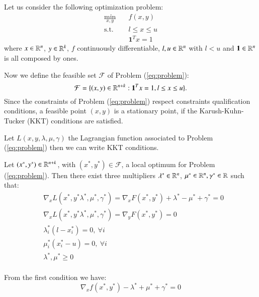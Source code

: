 Let us consider the following optimization problem:
\begin{subequations}\label{eq:problem} 
\begin{align}
\min_{x,y} & \quad f(x,y)  \\
\text{s.t.} & \quad l \leq x \leq u \\
& \quad \mathbf{1}^T x = 1 
\end{align}
\end{subequations}
where $x \in \mathbb{R}^n$, $y \in \mathbb{R}^k$, $f$ continuously differentiable, $l, u \in \mathbb{R}^n$ with $l < u$ and $\mathbf{1} \in \mathbb{R}^n$ is all composed by ones. 

Now we define the feasible set $\mathcal{F}$  of Problem (\ref{eq:problem}):
\begin{equation}
\mathcal{F} = \{(x,y) \in \mathbb{R}^{n+k} : \mathbf{1}^T x = 1, l \leq x \leq u\}.
\end{equation}
Since the constraints of Problem (\ref{eq:problem}) respect constraints qualification conditions, a feasible point $(x,y)$ is a stationary point, if the Karush-Kuhn-Tucker (KKT) conditions are satisfied.

Let $L(x,y,\lambda,\mu,\gamma)$ the Lagrangian function associated to Problem (\ref{eq:problem}) then we can write KKT conditions.

\begin{proposition}\label{prop:KKT}

Let $(x^*,y^*) \in \mathbb{R}^{n+k}$, with $(x^*,y^*) \in \mathcal{F}$, a local optimum for Problem (\ref{eq:problem}). Then there exist three multipliers $\lambda^* \in \mathbb{R}^n$, $\mu^* \in \mathbb{R}^n, \gamma^* \in \mathbb{R}$ such that:
\begin{equation}
 \begin{aligned}
  &\nabla_x L(x^*,y^*\lambda^*,\mu^*,\gamma^*)= \nabla_x F(x^*,y^*)+\lambda^*-\mu^*+\gamma^*=0\\
 &\nabla_x L(x^*,y^*\lambda^*,\mu^*,\gamma^*)=\nabla_y F(x^*,y^*) =0 \\
    &\lambda^*_i(l-x_i^*)=0,\ \forall i\\
 &\mu^*_i(x_i^*-u)=0,\ \forall i\\
   & \lambda^*,\mu^*\ge0 \\
 \end{aligned}
\end{equation}
\end{proposition}

From the first condition we have:
\begin{equation}
 \nabla_x f(x^*,y^*)-\lambda^*+\mu^*+\gamma^*=0
\end{equation}

